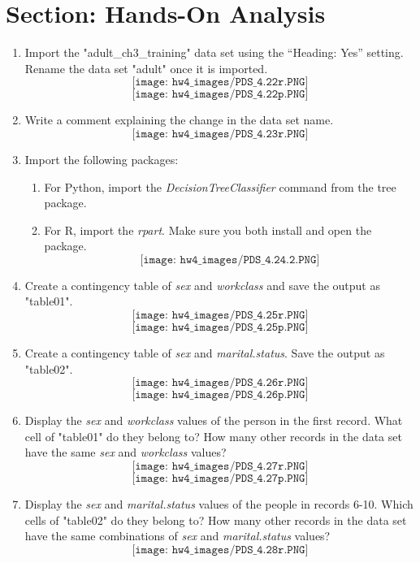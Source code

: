 \documentclass[11pt]{article}
\theoremstyle{definition}
\newcommand{\1}[1]{\mathbf{1} \left \{ #1 \right \}}
\begin{document}
\section{Section: Hands-On Analysis}
\begin{enumerate}\addtocounter{enumi}{21}
    \item Import the "adult\_ch3\_training" data set using the “Heading: Yes” setting. Rename the data set "adult" once it is imported.
    \[\texttt{[image: hw4\_images/PDS\_4.22r.PNG]}\]
    \[\texttt{[image: hw4\_images/PDS\_4.22p.PNG]}\]
    \item Write a comment explaining the change in the data set name.
    \[\texttt{[image: hw4\_images/PDS\_4.23r.PNG]}\]
    \item Import the following packages:
    \begin{enumerate}[(1)]
        \item For Python, import the \textit{DecisionTreeClassifier} command from the tree package.
        \item For R, import the \textit{rpart}. Make sure you both install and open the package.
        \[\texttt{[image: hw4\_images/PDS\_4.24.2.PNG]}\]
    \end{enumerate}
    \item Create a contingency table of \textit{sex} and \textit{workclass} and save the output as "table01".
    \[\texttt{[image: hw4\_images/PDS\_4.25r.PNG]}\]
    \[\texttt{[image: hw4\_images/PDS\_4.25p.PNG]}\]
    \item Create a contingency table of \textit{sex} and \textit{marital.status}. Save the output as "table02".
    \[\texttt{[image: hw4\_images/PDS\_4.26r.PNG]}\]
    \[\texttt{[image: hw4\_images/PDS\_4.26p.PNG]}\]
    \item Display the \textit{sex} and \textit{workclass} values of the person in the first record. What cell of "table01" do they belong to? How many other records in the data set have the same \textit{sex} and \textit{workclass} values?
    \[\texttt{[image: hw4\_images/PDS\_4.27r.PNG]}\]
    \[\texttt{[image: hw4\_images/PDS\_4.27p.PNG]}\]
    \item Display the \textit{sex} and \textit{marital.status} values of the people in records 6-10. Which cells of "table02" do they belong to? How many other records in the data set have the same combinations of \textit{sex} and \textit{marital.status} values?
    \[\texttt{[image: hw4\_images/PDS\_4.28r.PNG]}\]

\end{enumerate}
\end{document}
